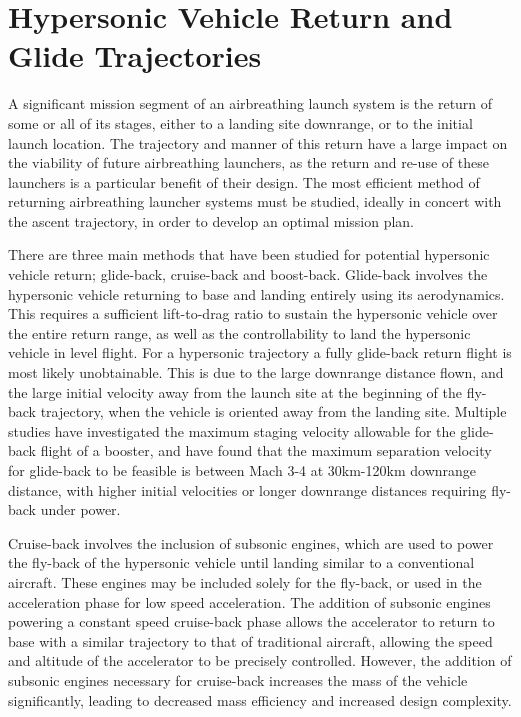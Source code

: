 \section{Hypersonic Vehicle Return and Glide Trajectories}


A significant mission segment of an airbreathing launch system is the return of some or all of its stages, either to a landing site downrange, or to the initial launch location. The trajectory and manner of this return have a large impact on the viability of future airbreathing launchers, as the return and re-use of these launchers is a particular benefit of their design\cite{Preller2017b}. The most efficient method of returning airbreathing launcher systems must be studied, ideally in concert with the ascent trajectory, in order to develop an optimal mission plan.  

There are three main methods that have been studied for potential hypersonic vehicle return; glide-back, cruise-back and boost-back. Glide-back involves the hypersonic vehicle returning to base and landing entirely using its aerodynamics. This requires a sufficient lift-to-drag ratio to sustain the hypersonic vehicle over the entire return range, as well as the controllability to land the hypersonic vehicle in level flight. 
For a hypersonic trajectory a fully glide-back return flight is most likely unobtainable\cite{Hellman,Tetlow1992}. This is due to the large downrange distance flown, and the large initial velocity away from the launch site at the beginning of the fly-back trajectory, when the vehicle is oriented away from the landing site. Multiple studies have investigated the maximum staging velocity allowable for the glide-back flight of a booster, and have found that the maximum separation velocity for glide-back to be feasible is between Mach 3-4 at 30km-120km downrange distance, with higher initial velocities or longer downrange distances requiring fly-back under power\cite{Hellman,Tetlow1992}.

Cruise-back involves the inclusion of subsonic engines, which are used to power the fly-back of the hypersonic vehicle until landing similar to a conventional aircraft. These engines may be included solely for the fly-back\cite{Hellman}, or used in the acceleration phase for low speed acceleration\cite{Mehta2001,Tetlow1992,Wilhite1991}. The addition of subsonic engines powering a constant speed cruise-back phase allows the accelerator to return to base with a similar trajectory to that of traditional aircraft, allowing the speed and altitude of the accelerator to be precisely controlled. However, the addition of subsonic engines necessary for cruise-back increases the mass of the vehicle significantly, leading to decreased mass efficiency and increased design complexity\cite{Hellman}. 

